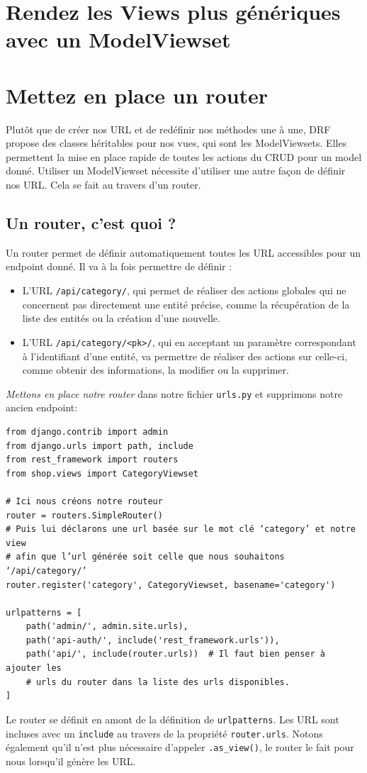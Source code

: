 \documentclass[a4paper]{article}
\begin{document}
\section{Rendez les Views plus génériques avec un ModelViewset}
\section{Mettez en place un {\color{monOrange}router}}
Plutôt que de créer nos URL et de redéfinir nos méthodes une à une, DRF propose des classes héritables pour nos vues, qui sont les {\color{monOrange}ModelViewsets}. Elles permettent la mise en place rapide de toutes les actions du CRUD pour un model donné. Utiliser un ModelViewset nécessite d’utiliser une autre façon de définir nos URL. Cela se fait au travers d’un {\color{monOrange}router}.
\subsection*{Un router, c’est quoi ?}
Un router permet de définir automatiquement toutes les URL accessibles pour un endpoint donné. Il va à la fois permettre de définir :
\begin{itemize}
\item L’URL  {\tt /api/category/}, qui permet de réaliser des actions globales qui ne concernent pas directement une entité précise, comme la récupération de la liste des entités ou la création d’une nouvelle.
\item L’URL  {\tt /api/category/<pk>/}, qui en acceptant un paramètre correspondant à l’identifiant d’une entité, va permettre de réaliser des actions sur celle-ci, comme obtenir des informations, la modifier ou la supprimer.
\end{itemize}
{\em Mettons en place notre {\color{monOrange}router}} dans notre fichier {\tt urls.py}  et supprimons notre ancien {\color{monOrange}endpoint}: 
\begin{verbatim}
from django.contrib import admin
from django.urls import path, include
from rest_framework import routers
from shop.views import CategoryViewset
 
# Ici nous créons notre routeur
router = routers.SimpleRouter()
# Puis lui déclarons une url basée sur le mot clé ‘category’ et notre view
# afin que l’url générée soit celle que nous souhaitons ‘/api/category/’
router.register('category', CategoryViewset, basename='category')
 
urlpatterns = [
    path('admin/', admin.site.urls),
    path('api-auth/', include('rest_framework.urls')),
    path('api/', include(router.urls))  # Il faut bien penser à ajouter les 
    # urls du router dans la liste des urls disponibles.
]
\end{verbatim}
Le router se définit en amont de la définition de  {\tt urlpatterns}. Les URL sont incluses avec un  {\tt include}  au travers de la propriété  {\tt router.urls}. Notons également qu’il n’est plus nécessaire d'appeler  {\tt .as\_view()}, le router le fait pour nous lorsqu’il génère les URL.
\end{document}
